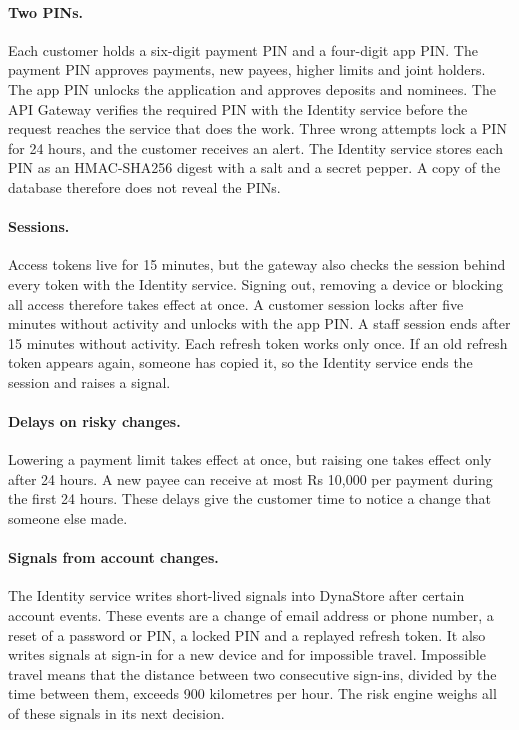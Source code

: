 \documentclass[11pt,a4paper]{article}
\begin{document}
\paragraph{Two PINs.} Each customer holds a six-digit payment PIN and a four-digit app PIN. The payment PIN approves payments, new payees, higher limits and joint holders. The app PIN unlocks the application and approves deposits and nominees. The API Gateway verifies the required PIN with the Identity service before the request reaches the service that does the work. Three wrong attempts lock a PIN for 24 hours, and the customer receives an alert. The Identity service stores each PIN as an HMAC-SHA256 digest with a salt and a secret pepper. A copy of the database therefore does not reveal the PINs.

\paragraph{Sessions.} Access tokens live for 15 minutes, but the gateway also checks the session behind every token with the Identity service. Signing out, removing a device or blocking all access therefore takes effect at once. A customer session locks after five minutes without activity and unlocks with the app PIN. A staff session ends after 15 minutes without activity. Each refresh token works only once. If an old refresh token appears again, someone has copied it, so the Identity service ends the session and raises a signal.

\paragraph{Delays on risky changes.} Lowering a payment limit takes effect at once, but raising one takes effect only after 24 hours. A new payee can receive at most Rs 10,000 per payment during the first 24 hours. These delays give the customer time to notice a change that someone else made.

\paragraph{Signals from account changes.} The Identity service writes short-lived signals into DynaStore after certain account events. These events are a change of email address or phone number, a reset of a password or PIN, a locked PIN and a replayed refresh token. It also writes signals at sign-in for a new device and for impossible travel. Impossible travel means that the distance between two consecutive sign-ins, divided by the time between them, exceeds 900 kilometres per hour. The risk engine weighs all of these signals in its next decision.
\end{document}
